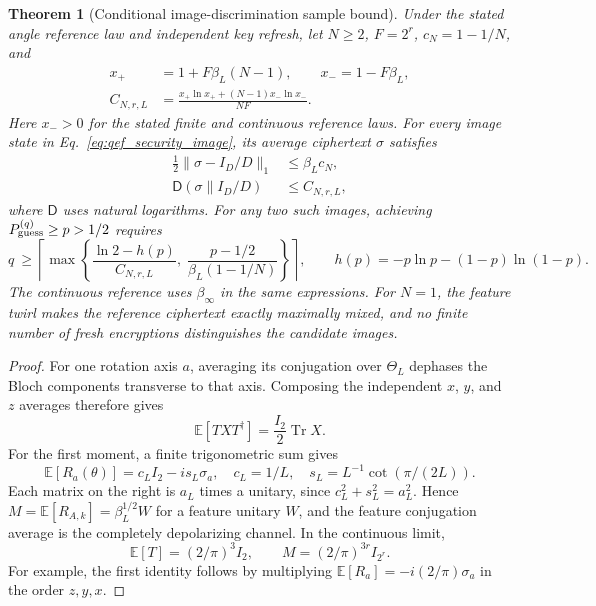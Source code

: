 \documentclass[11pt,a4paper]{article}
\newtheorem{theorem}{Theorem}
\begin{document}
{\begin{theorem}[Conditional image-discrimination sample bound]
\label{thm:qef_moment_sample_bound}
Under the stated angle reference law and independent key refresh, let
$N\geq2$, $F=2^r$, $c_N=1-1/N$, and
\begin{equation}
\label{eq:qef_information_budget}
 \begin{split}
 x_+&=1+F\beta_L(N-1),\qquad x_-=1-F\beta_L,\\
 C_{N,r,L}
 &=\frac{x_+\ln x_+ +(N-1)x_-\ln x_-}{NF}.
 \end{split}
\end{equation}
Here $x_->0$ for the stated finite and continuous reference laws.
For every image state in Eq.~\eqref{eq:qef_security_image}, its average
ciphertext $\sigma$ satisfies
\begin{align}
 \frac12\|\sigma-I_D/D\|_1&\leq\beta_Lc_N,
 \label{eq:qef_one_image_distance}\\
 \mathsf D(\sigma\|I_D/D)&\leq C_{N,r,L},
 \label{eq:qef_cipher_relative_entropy}
\end{align}
where $\mathsf D$ uses natural logarithms. For any two such images,
achieving $P_{\rm guess}^{(q)}\geq p>1/2$ requires
\begin{equation}
\boxed{\displaystyle
 q\ \geq\left\lceil\max\left\{
 \frac{\ln2-h(p)}{C_{N,r,L}},\;
 \frac{p-1/2}{\beta_L(1-1/N)}
 \right\}\right\rceil,}
 \qquad h(p)=-p\ln p-(1-p)\ln(1-p).
\label{eq:qef_final_sample_bound}
\end{equation}
The continuous reference uses $\beta_\infty$ in the same expressions.
For $N=1$, the feature twirl makes the reference ciphertext exactly
maximally mixed, and no finite number of fresh encryptions distinguishes
the candidate images.
\end{theorem}

\begin{proof}
For one rotation axis $a$, averaging its conjugation over $\Theta_L$
dephases the Bloch components transverse to that axis. Composing the
independent $x$, $y$, and $z$ averages therefore gives
\begin{equation}
 \mathbb E[T X T^{\dagger}]=\frac{I_2}{2}\operatorname{Tr}X.
\end{equation}
For the first moment, a finite trigonometric sum gives
\begin{equation}
 \mathbb E[R_a(\theta)]
 =c_LI_2-is_L\sigma_a,
 \quad c_L=1/L,\quad s_L=L^{-1}\cot(\pi/(2L)).
\end{equation}
Each matrix on the right is $a_L$ times a unitary, since
$c_L^2+s_L^2=a_L^2$. Hence
$M=\mathbb E[R_{A,k}]=\beta_L^{1/2}W$ for a feature unitary $W$,
and the feature conjugation average is the completely depolarizing
channel. In the continuous limit,
\begin{equation}
 \mathbb E[T]=(2/\pi)^3 I_2,
 \qquad M=(2/\pi)^{3r}I_{2^r}.
\end{equation}
For example, the first identity follows by multiplying
$\mathbb E[R_a]=-i(2/\pi)\sigma_a$ in the order $z,y,x$.


\end{proof}}
\end{document}
